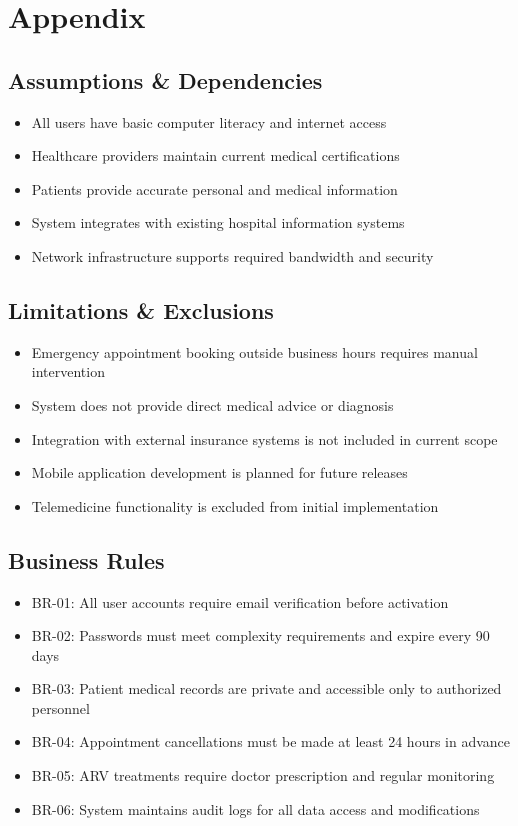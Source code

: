 \documentclass[12pt,a4paper]{article}
\begin{document}
\section{Appendix}

\subsection{Assumptions \& Dependencies}

\begin{itemize}
\item All users have basic computer literacy and internet access
\item Healthcare providers maintain current medical certifications
\item Patients provide accurate personal and medical information
\item System integrates with existing hospital information systems
\item Network infrastructure supports required bandwidth and security
\end{itemize}

\subsection{Limitations \& Exclusions}

\begin{itemize}
\item Emergency appointment booking outside business hours requires manual intervention
\item System does not provide direct medical advice or diagnosis
\item Integration with external insurance systems is not included in current scope
\item Mobile application development is planned for future releases
\item Telemedicine functionality is excluded from initial implementation
\end{itemize}

\subsection{Business Rules}

\begin{itemize}
\item BR-01: All user accounts require email verification before activation
\item BR-02: Passwords must meet complexity requirements and expire every 90 days
\item BR-03: Patient medical records are private and accessible only to authorized personnel
\item BR-04: Appointment cancellations must be made at least 24 hours in advance
\item BR-05: ARV treatments require doctor prescription and regular monitoring
\item BR-06: System maintains audit logs for all data access and modifications
\end{itemize}
\end{document}
